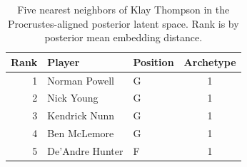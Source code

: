 \begin{table}[htbp]
  \centering\small
  \begin{tabular}{rllc}
    \toprule
    Rank & Player & Position & Archetype \\
    \midrule
    1 & Norman Powell & G & 1 \\
    2 & Nick Young & G & 1 \\
    3 & Kendrick Nunn & G & 1 \\
    4 & Ben McLemore & G & 1 \\
    5 & De'Andre Hunter & F & 1 \\
    \bottomrule
  \end{tabular}
  \caption{Five nearest neighbors of Klay Thompson in the Procrustes-aligned posterior latent space. Rank is by posterior mean embedding distance.}
  \label{tab:Klay_Thompson_neighbors}
\end{table}


